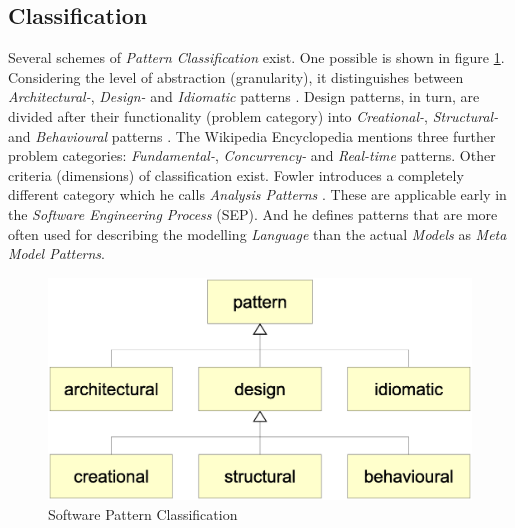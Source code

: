 %
%
%
%
%
%
%

\subsection{Classification}
\label{classification_heading}

Several schemes of \emph{Pattern Classification} exist. One possible is shown in
figure \ref{pattern_figure}. Considering the level of abstraction (granularity),
it distinguishes between \emph{Architectural-}, \emph{Design-} and \emph{Idiomatic}
patterns \cite{buschmann}. Design patterns, in turn, are divided after their
functionality (problem category) into \emph{Creational-}, \emph{Structural-}
and \emph{Behavioural} patterns \cite{gamma1995}. The Wikipedia Encyclopedia
\cite{wikipedia} mentions three further problem categories: \emph{Fundamental-},
\emph{Concurrency-} and \emph{Real-time} patterns. Other criteria (dimensions)
of classification exist. Fowler introduces a completely different category which
he calls \emph{Analysis Patterns} \cite{fowler1997}. These are applicable early
in the \emph{Software Engineering Process} (SEP). And he defines patterns that
are more often used for describing the modelling \emph{Language} than the actual
\emph{Models} as \emph{Meta Model Patterns}.

\begin{figure}[ht]
    \begin{center}
        \includegraphics[scale=0.3]{vector/pattern.eps}
        \caption{Software Pattern Classification}
        \label{pattern_figure}
    \end{center}
\end{figure}
